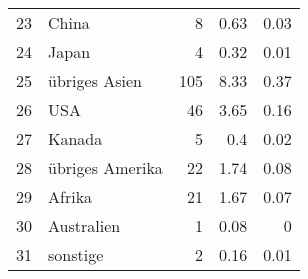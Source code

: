 \begin{longtable}{lXrrr}
        23 & \multicolumn{1}{X}{China} & %
          \num{8} &
          \num[round-mode=places,round-precision=2]{0.63} &
          \num[round-mode=places,round-precision=2]{0.03} \\

        24 & \multicolumn{1}{X}{Japan} & %
          \num{4} &
          \num[round-mode=places,round-precision=2]{0.32} &
          \num[round-mode=places,round-precision=2]{0.01} \\

        25 & \multicolumn{1}{X}{übriges Asien} & %
          \num{105} &
          \num[round-mode=places,round-precision=2]{8.33} &
          \num[round-mode=places,round-precision=2]{0.37} \\

        26 & \multicolumn{1}{X}{USA} & %
          \num{46} &
          \num[round-mode=places,round-precision=2]{3.65} &
          \num[round-mode=places,round-precision=2]{0.16} \\

        27 & \multicolumn{1}{X}{Kanada} & %
          \num{5} &
          \num[round-mode=places,round-precision=2]{0.4} &
          \num[round-mode=places,round-precision=2]{0.02} \\

        28 & \multicolumn{1}{X}{übriges Amerika} & %
          \num{22} &
          \num[round-mode=places,round-precision=2]{1.74} &
          \num[round-mode=places,round-precision=2]{0.08} \\

        29 & \multicolumn{1}{X}{Afrika} & %
          \num{21} &
          \num[round-mode=places,round-precision=2]{1.67} &
          \num[round-mode=places,round-precision=2]{0.07} \\

        30 & \multicolumn{1}{X}{Australien} & %
          \num{1} &
          \num[round-mode=places,round-precision=2]{0.08} &
          \num[round-mode=places,round-precision=2]{0} \\

        31 & \multicolumn{1}{X}{sonstige} & %
          \num{2} &
          \num[round-mode=places,round-precision=2]{0.16} &
          \num[round-mode=places,round-precision=2]{0.01} \\


\end{longtable}
